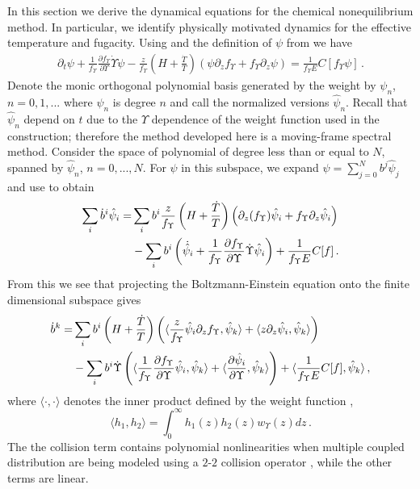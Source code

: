 
\label{dynamicsSec}
In this section we derive the dynamical equations for the chemical nonequilibrium method. In particular, we identify physically motivated dynamics for the effective temperature and fugacity. Using  and the definition of $\psi$ from  we have
\begin{align}\label{nearEquilibEq}
\partial_t \psi+\frac{1}{f_\Upsilon }\frac{\partial f_\Upsilon }{\partial\Upsilon}\dot\Upsilon\psi-\frac{z}{f_\Upsilon }\left(H+\frac{\dot{T}}{T}\right)\left(\psi\partial_zf_\Upsilon +f_\Upsilon \partial_z \psi\right)=\frac{1}{f_\Upsilon E}C[f_\Upsilon \psi]\,.
\end{align}
Denote the monic orthogonal polynomial basis generated by the weight  by $\psi_n$, $n=0,1,...$ where $\psi_n$ is degree $n$ and call the normalized versions  $\hat{\psi}_n$. Recall that $\hat\psi_n$ depend on $t$ due to the $\Upsilon$ dependence of the weight function used in the construction; therefore the method developed here is a moving-frame spectral method. Consider the space of polynomial of degree less than or equal to $N$, spanned by $\hat\psi_n$, $n=0,...,N$.   For $\psi$ in this subspace, we expand $\psi=\sum_{j=0}^Nb^j\hat\psi_j$ and use   to obtain
\begin{align}\label{Tvars}
\sum_i \dot{b}^i\hat\psi_i=&\sum_ib^i\frac{z}{f_\Upsilon }\left(H+\frac{\dot{T}}{T}\right)\left(\partial_z(f_\Upsilon )\hat\psi_i+f_\Upsilon \partial_z\hat\psi_i\right)\\
&-\sum_ib^i\left(\dot{\hat{\psi}}_i+\frac{1}{f_\Upsilon }\frac{\partial f_\Upsilon }{\partial\Upsilon}\dot\Upsilon\hat\psi_i\right)+\frac{1}{f_\Upsilon E}C[f]\,.
\notag
\end{align}
From this we see  that  projecting the Boltzmann-Einstein equation onto the finite dimensional subspace gives
\begin{align}
\dot b^k=& \sum_i b^i\left(H+\frac{\dot{T}}{T}\right)\left(\langle\frac{z}{f_\Upsilon }\hat\psi_i\partial_zf_\Upsilon ,\hat\psi_k\rangle+\langle z\partial_z \hat\psi_i,\hat\psi_k\rangle\right) \\
&-\sum_i b^i\dot{\Upsilon}\left(\langle\frac{1}{f_\Upsilon }\frac{\partial f_\Upsilon }{\partial\Upsilon}\hat\psi_i,\hat\psi_k\rangle+\langle\frac{\partial\hat{\psi}_i}{\partial \Upsilon},\hat\psi_k\rangle\right)+\langle\frac{1}{f_\Upsilon E}C[f],\hat\psi_k\rangle\notag\,,
\end{align}
where $\langle\cdot,\cdot\rangle$ denotes the inner product defined by the weight function ,
\begin{equation}
\langle h_1,h_2\rangle=\int_0^\infty h_1(z)h_2(z)w_\Upsilon(z)dz\,.
\end{equation}
The the collision term contains polynomial nonlinearities when multiple coupled distribution are being modeled using a $2$-$2$ collision operator , while the other terms are linear.  

